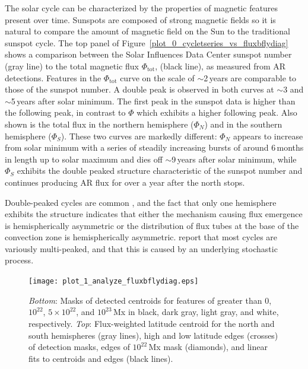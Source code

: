 The solar cycle can be characterized by the properties of magnetic features present over time. Sunspots are composed of strong magnetic fields so it is natural to compare the amount of magnetic field on the Sun to the traditional sunspot cycle. The top panel of Figure~\ref{plot_0_cycletseries_vs_fluxbflydiag} shows a comparison between the Solar Influences Data Center sunspot number (gray line) to the total magnetic flux $\Phi_{\mathrm{tot}}$, (black line), as measured from \gls{AR} detections. Features in the $\Phi_{\mathrm{tot}}$ curve on the scale of $\sim$2\,years are comparable to those of the sunspot number. A double peak is observed in both curves at $\sim$3 and $\sim$5\,years after solar minimum. The first peak in the sunspot data is higher than the following peak, in contrast to $\Phi$ which exhibits a higher following peak. Also shown is the total flux in the northern hemisphere ($\Phi_N$) and in the southern hemisphere ($\Phi_S$). These two curves are markedly different: $\Phi_N$ appears to increase from solar minimum with a series of steadily increasing bursts of around 6\,months in length up to solar maximum and dies off $\sim$9\,years after solar minimum, while $\Phi_S$ exhibits the double peaked structure characteristic of the sunspot number and continues producing \gls{AR} flux for over a year after the north stops. 

Double-peaked cycles are common \citep{gnevyshev:1977}, and the fact that only one hemisphere exhibits the structure indicates that either the mechanism causing flux emergence is hemispherically asymmetric or the distribution of flux tubes at the base of the convection zone is hemispherically asymmetric. 
\citet{wang:2003a} report that most cycles are variously multi-peaked, and that this is caused by an underlying stochastic process.


\begin{figure}[!t]
\centerline{\texttt{[image: plot\_1\_analyze\_fluxbflydiag.eps]}}
\caption[A butterfly map indicating magnetic flux emergence.]{\emph{Bottom}: Masks of detected centroids for features of greater than $0$, $10^{22}$, $5\times10^{22}$, and $10^{23}$\,Mx in black, dark gray, light gray, and white, respectively. \emph{Top}: Flux-weighted latitude centroid for the north and south hemispheres (gray lines), high and low latitude edges (crosses) of detection masks, edges of $10^{22}$\,Mx mask (diamonds), and linear fits to centroids and edges (black lines).}
\label{plot_1_analyze_fluxbflydiag}
\end{figure}


